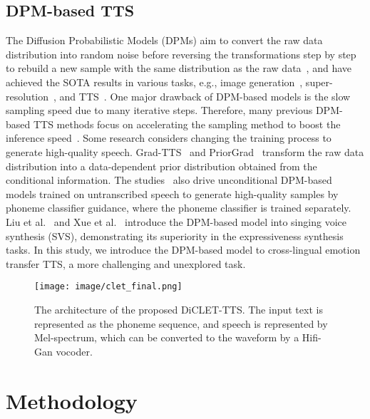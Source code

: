 \documentclass[journal,comsoc]{IEEEtran}
\begin{document}
\vspace{-0.2cm}
\subsection{DPM-based TTS}

The Diffusion Probabilistic Models (DPMs) aim to convert the raw data distribution into random noise before reversing the transformations step by step to rebuild a new sample with the same distribution as the raw data~\cite{sohl2015deep,cao2022survey}, and have achieved the SOTA results in various tasks, e.g., image generation~\cite{dhariwal2021diffusion,song2020denoising}, super-resolution~\cite{kawar2022denoising,rombach2022high}, and TTS~\cite{popov2021grad,chen2021wavegrad,jeong2021diff,popov2021diffusion}. 
One major drawback of DPM-based models is the slow sampling speed due to many iterative steps. 
Therefore, many previous DPM-based TTS methods focus on accelerating the sampling method to boost the inference speed~\cite{jeong2021diff,huang2022fastdiff,leng2022binauralgrad,huang2022prodiff,yang2022diffsound}.
Some research considers changing the training process to generate high-quality speech. 
Grad-TTS~\cite{popov2021grad} and PriorGrad~\cite{lee2021priorgrad} transform the raw data distribution into a data-dependent prior distribution obtained from the conditional information. 
The studies~\cite{kim2022guided,kim22guided} also drive unconditional DPM-based models trained on untranscribed speech to generate high-quality samples by phoneme classifier guidance, where the phoneme classifier is trained separately.
Liu et al.~\cite{liu2022diffsinger} and Xue et al.~\cite{xue22c_interspeech} introduce the DPM-based model into singing voice synthesis (SVS), demonstrating its superiority in the expressiveness synthesis tasks.
In this study, we introduce the DPM-based model to cross-lingual emotion transfer TTS, a more challenging and unexplored task.

\begin{figure*}[htb]	
	\centering
	\texttt{[image: image/clet\_final.png]} 
	\caption{The architecture of the proposed DiCLET-TTS. The input text is represented as the phoneme sequence, and speech is represented by Mel-spectrum, which can be converted to the waveform by a Hifi-Gan vocoder.}
	\label{fig:frame1}
\vspace{-0.2cm} 
\end{figure*}


\section{Methodology}
\label{sc:method}
\end{document}
